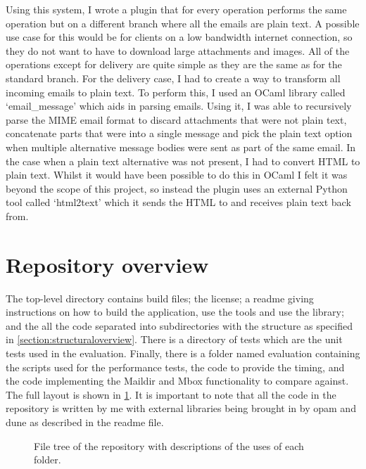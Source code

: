 Using this system, I wrote a plugin that for every operation performs the same operation but on a different branch where all the emails are plain text. A possible use case for this would be for clients on a low bandwidth internet connection, so they do not want to have to download large attachments and images. All of the operations except for delivery are quite simple as they are the same as for the standard branch. For the delivery case, I had to create a way to transform all incoming emails to plain text. To perform this, I used an OCaml library called `email\_message' which aids in parsing emails. Using it, I was able to recursively parse the MIME email format to discard attachments that were not plain text, concatenate parts that were into a single message and pick the plain text option when multiple alternative message bodies were sent as part of the same email. In the case when a plain text alternative was not present, I had to convert HTML to plain text. Whilst it would have been possible to do this in OCaml I felt it was beyond the scope of this project, so instead the plugin uses an external Python tool called `html2text' which it sends the HTML to and receives plain text back from.

\section{Repository overview}

The top-level directory contains build files; the license; a readme giving instructions on how to build the application, use the tools and use the library; and the all the code separated into subdirectories with the structure as specified in \ref{section:structuraloverview}. There is a directory of tests which are the unit tests used in the evaluation. Finally, there is a folder named evaluation containing the scripts used for the performance tests, the code to provide the timing, and the code implementing the Maildir and Mbox functionality to compare against. The full layout is shown in \ref{fig:repositorytree}. It is important to note that all the code in the repository is written by me with external libraries being brought in by opam and dune as described in the readme file.

\begin{figure}[h]
\footnotesize
\renewcommand\DTstylecomment{\rmfamily\fontfamily{bch}}
\caption{File tree of the repository with descriptions of the uses of each folder.}
\label{fig:repositorytree}
\end{figure}
